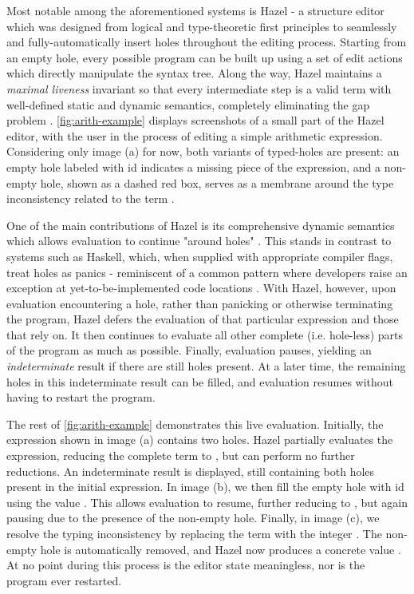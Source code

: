 Most notable among the aforementioned systems is Hazel - a structure editor which was designed from logical and type-theoretic first principles to seamlessly and fully-automatically insert holes throughout the editing process. Starting from an empty hole, every possible program can be built up using a set of edit actions which directly manipulate the syntax tree. Along the way, Hazel maintains a \emph{maximal liveness} invariant so that every intermediate step is a valid term with well-defined static and dynamic semantics, completely eliminating the gap problem \cite{DBLP:journals/pacmpl/OmarVCH19}. \autoref{fig:arith-example} displays screenshots of a small part of the Hazel editor, with the user in the process of editing a simple arithmetic expression. Considering only image (a) for now, both variants of typed-holes are present: an empty hole labeled with id  indicates a missing piece of the expression, and a non-empty hole, shown as a dashed red box, serves as a membrane around the type inconsistency related to the term .

One of the main contributions of Hazel is its comprehensive dynamic semantics which allows evaluation to continue "around holes" \cite{DBLP:journals/pacmpl/OmarVCH19}. This stands in contrast to systems such as Haskell, which, when supplied with appropriate compiler flags, treat holes as panics - reminiscent of a common pattern where developers raise an exception at yet-to-be-implemented code locations \cite{GHCHoles}. With Hazel, however, upon evaluation encountering a hole, rather than panicking or otherwise terminating the program, Hazel defers the evaluation of that particular expression and those that rely on. It then continues to evaluate all other complete (i.e. hole-less) parts of the program as much as possible. Finally, evaluation pauses, yielding an \emph{indeterminate} result if there are still holes present. At a later time, the remaining holes in this indeterminate result can be filled, and evaluation resumes without having to restart the program. 

The rest of \autoref{fig:arith-example} demonstrates this live evaluation. Initially, the expression shown in image (a) contains two holes. Hazel partially evaluates the expression, reducing the complete term  to , but can perform no further reductions. An indeterminate result is displayed, still containing both holes present in the initial expression. In image (b), we then fill the empty hole with id  using the value . This allows evaluation to resume, further reducing  to , but again pausing due to the presence of the non-empty hole. Finally, in image (c), we resolve the typing inconsistency by replacing the term  with the integer . The non-empty hole is automatically removed, and Hazel now produces a concrete value . At no point during this process is the editor state meaningless, nor is the program ever restarted.


